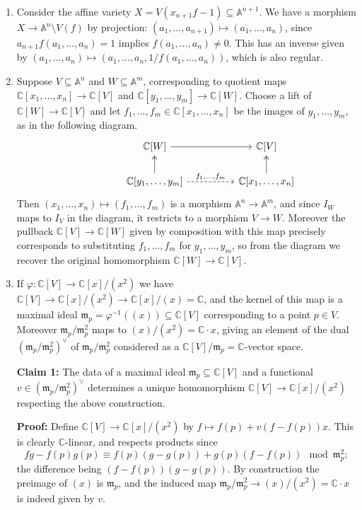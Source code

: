 \documentclass[a4paper]{article}
\theoremstyle{definition}
\theoremstyle{remark}
\newcommand{\m}{\mathfrak{m}}
\newcommand{\A}{\mathbb{A}}
\newcommand{\C}{\mathbb{C}}
\begin{document}
\begin{enumerate}
\begin{enumerate}[label=(\alph*)]
\end{enumerate}

\item
Consider the affine variety $X=V(x_{n+1}f-1)\subseteq\A^{n+1}$. We have a
morphism $X\to\A^n\setminus V(f)$ by projection:
$(a_1,\ldots,a_{n+1})\mapsto(a_1,\ldots,a_n)$, since
$a_{n+1}f(a_1,\ldots,a_n)=1$ implies $f(a_1,\ldots,a_n)\ne0$. This has an
inverse given by $(a_1,\ldots,a_n)\mapsto(a_1,\ldots,a_n,1/f(a_1,\ldots,a_n))$,
which is also regular.

\item
Suppose $V\subseteq\A^n$ and $W\subseteq\A^m$, corresponding to quotient maps
$\C[x_1,\ldots,x_n]\to\C[V]$ and $\C[y_1,\ldots,y_m]\to\C[W]$. Choose a
lift of $\C[W]\to\C[V]$ and let $f_1,\ldots,f_m\in\C[x_1,\ldots,x_n]$
be the images of $y_1,\ldots,y_m$, as in the following diagram.
\begin{equation*}
\begin{tikzcd}[column sep=huge]
    &\C[W] \ar[r] &\C[V] \\
    &\C[y_1,\ldots,y_m] \ar[u,two heads] \ar[r,dashed,"f_1{,}\ldots{,}f_m"]
    &\C[x_1,\ldots,x_n] \ar[u,two heads]
\end{tikzcd}
\end{equation*}
Then $(x_1,\ldots,x_n)\mapsto(f_1,\ldots,f_m)$ is a morphism $\A^n\to\A^m$, and
since $I_W$ maps to $I_V$ in the diagram, it restricts to a morphism $V\to W$.
Moreover the pullback $\C[V]\to\C[W]$ given by composition with this map
precisely corresponds to substituting $f_1,\ldots,f_m$ for $y_1,\ldots,y_m$, so
from the diagram we recover the original homomorphism $\C[W]\to\C[V]$.

\item
If $\varphi:\C[V]\to\C[x]/(x^2)$ we have $\C[V]\to\C[x]/(x^2)\to\C[x]/(x)=\C$,
and the kernel of this map is a maximal ideal
$\m_p=\varphi^{-1}((x))\subseteq\C[V]$ corresponding to a point $p\in V$.
Moreover $\m_p/\m_p^2$ maps to $(x)/(x^2)=\C\cdot x$, giving an element of the
dual $(\m_p/\m_p^2)^\vee$ of $\m_p/\m_p^2$ considered as a
$\C[V]/\m_p=\C$-vector space.

\textbf{Claim 1:}
The data of a maximal ideal $\m_p\subseteq\C[V]$ and a functional
$v\in(\m_p/\m_p^2)^\vee$ determines a unique homomorphism $\C[V]\to\C[x]/(x^2)$
respecting the above construction.

\textbf{Proof:}
Define $\C[V]\to\C[x]/(x^2)$ by $f\mapsto f(p)+v(f-f(p))x$. This is clearly
$\C$-linear, and respects products since
\begin{equation*}
    fg-f(p)g(p) \equiv f(p)(g-g(p)) + g(p)(f-f(p)) \mod \m_p^2;
\end{equation*}
the difference being $(f-f(p))(g-g(p))$. By construction the preimage of $(x)$
is $\m_p$, and the induced map $\m_p/\m_p^2\to(x)/(x^2)=\C\cdot x$ is indeed
given by $v$.


\end{enumerate}
\end{document}
